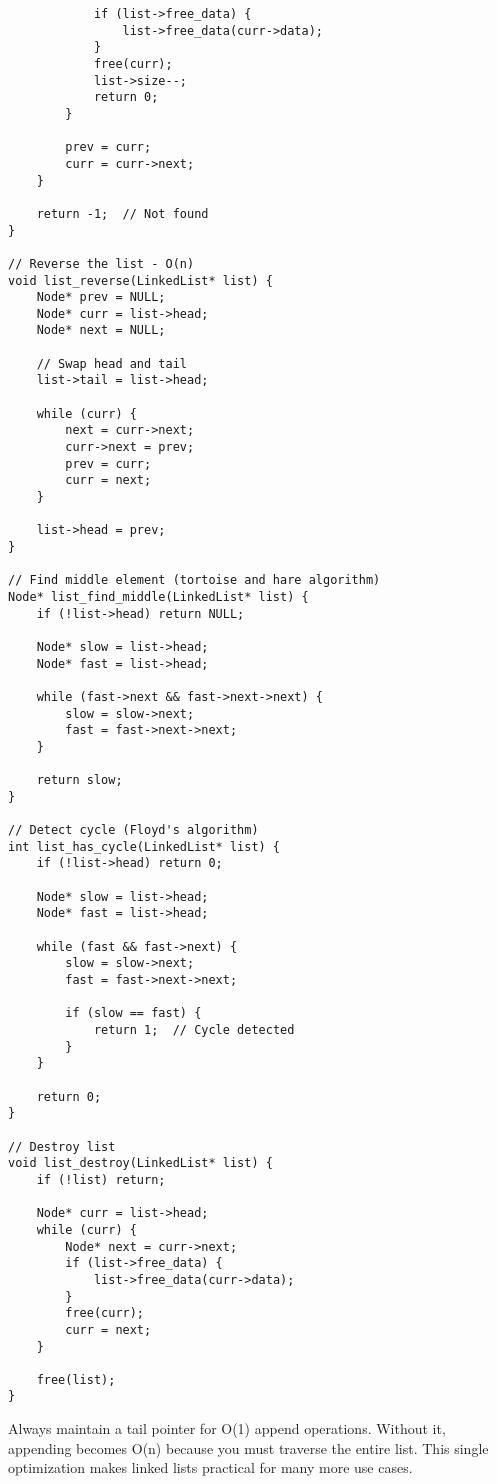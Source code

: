 \begin{lstlisting}
            if (list->free_data) {
                list->free_data(curr->data);
            }
            free(curr);
            list->size--;
            return 0;
        }

        prev = curr;
        curr = curr->next;
    }

    return -1;  // Not found
}

// Reverse the list - O(n)
void list_reverse(LinkedList* list) {
    Node* prev = NULL;
    Node* curr = list->head;
    Node* next = NULL;

    // Swap head and tail
    list->tail = list->head;

    while (curr) {
        next = curr->next;
        curr->next = prev;
        prev = curr;
        curr = next;
    }

    list->head = prev;
}

// Find middle element (tortoise and hare algorithm)
Node* list_find_middle(LinkedList* list) {
    if (!list->head) return NULL;

    Node* slow = list->head;
    Node* fast = list->head;

    while (fast->next && fast->next->next) {
        slow = slow->next;
        fast = fast->next->next;
    }

    return slow;
}

// Detect cycle (Floyd's algorithm)
int list_has_cycle(LinkedList* list) {
    if (!list->head) return 0;

    Node* slow = list->head;
    Node* fast = list->head;

    while (fast && fast->next) {
        slow = slow->next;
        fast = fast->next->next;

        if (slow == fast) {
            return 1;  // Cycle detected
        }
    }

    return 0;
}

// Destroy list
void list_destroy(LinkedList* list) {
    if (!list) return;

    Node* curr = list->head;
    while (curr) {
        Node* next = curr->next;
        if (list->free_data) {
            list->free_data(curr->data);
        }
        free(curr);
        curr = next;
    }

    free(list);
}
\end{lstlisting}

\begin{tipbox}
Always maintain a tail pointer for O(1) append operations. Without it, appending becomes O(n) because you must traverse the entire list. This single optimization makes linked lists practical for many more use cases.
\end{tipbox}

